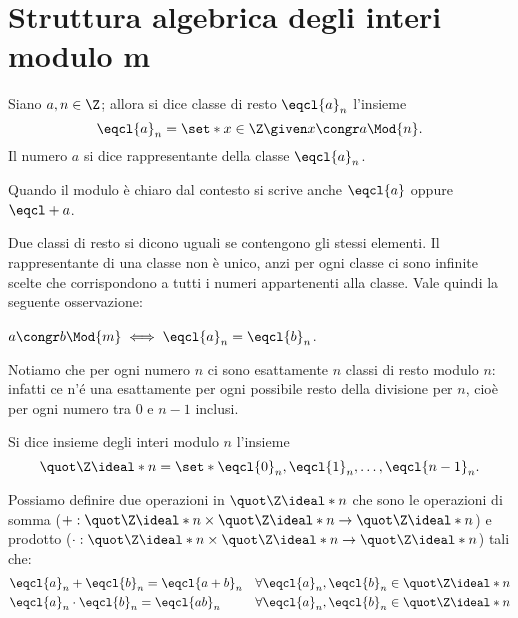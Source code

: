 \section{Struttura algebrica degli interi modulo m}

\begin{definition}
    Siano $a, n \in \Z$; allora si dice classe di resto $\eqcl{a}_n$ l'insieme 
    \begin{equation}
        \eqcl{a}_n = \set*{x \in \Z \given x \congr a \Mod{n}}.
    \end{equation}
    Il numero $a$ si dice rappresentante della classe $\eqcl{a}_n$.
\end{definition}

Quando il modulo è chiaro dal contesto si scrive anche $\eqcl{a}$ oppure $\eqcl+{a}$.

Due classi di resto si dicono uguali se contengono gli stessi elementi.
Il rappresentante di una classe non è unico, anzi per ogni classe ci sono infinite scelte che corrispondono a tutti i numeri appartenenti alla classe. Vale quindi la seguente osservazione:
\begin{remark}
    $a \congr b \Mod{m} \iff \eqcl{a}_n = \eqcl{b}_n$.
\end{remark}

Notiamo che per ogni numero $n$ ci sono esattamente $n$ classi di resto modulo $n$: infatti ce n'é una esattamente per ogni possibile resto della divisione per $n$, cioè per ogni numero tra $0$ e $n-1$ inclusi.

\begin{definition}
    Si dice insieme degli interi modulo $n$ l'insieme
    \begin{equation}
        \Zmod{n} = \set*{ \eqcl{0}_n, \eqcl{1}_n, \dots,\eqcl{n-1}_n}.
    \end{equation}
\end{definition}

Possiamo definire due operazioni in $\Zmod{n}$ che sono le operazioni di somma ($+ : \Zmod{n} \times \Zmod{n} \to \Zmod{n}$) e prodotto ($\cdot : \Zmod{n} \times \Zmod{n} \to \Zmod{n}$) tali che:
\begin{align}
    &\eqcl{a}_n + \eqcl{b}_n = \eqcl{a+b}_n    &\forall \eqcl{a}_n, \eqcl{b}_n \in \Zmod{n}\\
    &\eqcl{a}_n \cdot \eqcl{b}_n = \eqcl{ab}_n &\forall \eqcl{a}_n, \eqcl{b}_n \in \Zmod{n}
\end{align}


